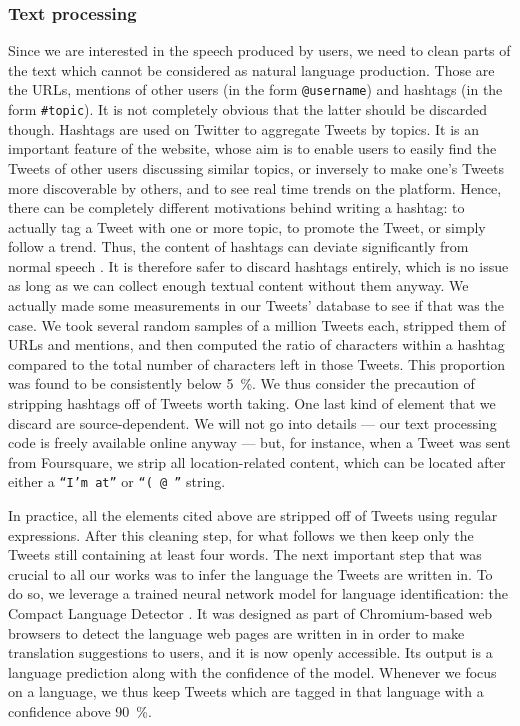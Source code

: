 \documentclass[../thesis.tex]{subfiles}
\begin{document}
\subsubsection{Text processing}
\label{sec:method_text_process}
Since we are interested in the speech produced by users, we need to clean parts of the
text which cannot be considered as natural language production. Those are the URLs,
mentions of other users (in the form \texttt{@username}) and hashtags (in the form
\texttt{\#topic}). It is not completely obvious that the latter should be discarded
though. Hashtags are used on Twitter to aggregate Tweets by topics. It is an important
feature of the website, whose aim is to enable users to easily find the Tweets of other
users discussing similar topics, or inversely to make one's Tweets more discoverable by
others, and to see real time trends on the platform. Hence, there can be completely
different motivations behind writing a hashtag: to actually tag a Tweet with one or more
topic, to promote the Tweet, or simply follow a trend. Thus, the content of hashtags can
deviate significantly from normal speech \cite{PageLinguisticsSelfbranding2012}. It is
therefore safer to discard hashtags entirely, which is no issue as long as we can
collect enough textual content without them anyway. We actually made some measurements
in our Tweets' database to see if that was the case. We took several random samples of a
million Tweets each, stripped them of URLs and mentions, and then computed the ratio of
characters within a hashtag compared to the total number of characters left in those
Tweets. This proportion was found to be consistently below \SI{5}{\percent}. We thus
consider the precaution of stripping hashtags off of Tweets worth taking. One last kind
of element that we discard are source-dependent. We will not go into details --- our
text processing code is freely available online anyway --- but, for instance, when a
Tweet was sent from Foursquare, we strip all location-related content, which can be
located after either a \texttt{``I'm at''} or \texttt{``( @ ''} string.

In practice, all the elements cited above are stripped off of Tweets using regular
expressions. After this cleaning step, for what follows we then keep only the Tweets
still containing at least four words. The next important step that was crucial to all
our works was to infer the language the Tweets are written in. To do so, we leverage a
trained neural network model for language identification: the Compact Language Detector
\cite{SalcianuCompactLanguage2023}. It was designed as part of Chromium-based web
browsers to detect the language web pages are written in in order to make translation
suggestions to users, and it is now openly accessible. Its output is a language
prediction along with the confidence of the model. Whenever we focus on a language, we
thus keep Tweets which are tagged in that language with a confidence above
\SI{90}{\percent}.
\end{document}
